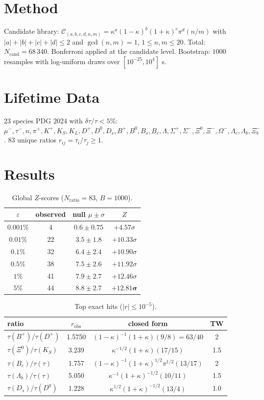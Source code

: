 \documentclass[reprint,amsmath,amssymb,aps,prl,superscriptaddress,nofootinbib]{revtex4-2}
\begin{document}
\section{Method}
Candidate library: $\mathcal{C}_{(a,b,c,d,n,m)} = \kappa^{a}(1-\kappa)^{b}(1+\kappa)^{c}\pi^{d}(n/m)$ with $|a|+|b|+|c|+|d| \leq 2$ and $\gcd(n,m) = 1$, $1 \leq n,m \leq 20$. Total: $N_{\mathrm{cand}} = 68\,340$. Bonferroni applied at the candidate level. Bootstrap: $1000$ resamples with log-uniform draws over $[10^{-25}, 10^4]$ s.

\section{Lifetime Data}
23 species PDG 2024 with $\delta\tau/\tau < 5\%$: $\mu^{-}, \tau^{-}, n, \pi^{+}, K^{+}, K_{S}, K_{L}, D^{+}, D^{0}, D_{s}, B^{+}, B^{0}, B_{s}, B_{c}, \Lambda, \Sigma^{+}, \Sigma^{-}, \Xi^{0}, \Xi^{-}, \Omega^{-}, \Lambda_{c}, \Lambda_{b}, \Xi_{b}^{-}$. 83 unique ratios $r_{ij} = \tau_{i}/\tau_{j} \geq 1$.

\section{Results}
\begin{table}[h!]
\centering
\caption{Global $Z$-scores ($N_{\mathrm{ratio}}=83$, $B=1000$).}
\begin{tabular}{cccc}
\toprule
$\varepsilon$ & observed & null $\mu \pm \sigma$ & $Z$ \\
\midrule
$0.001\%$ & 4 & $0.6 \pm 0.75$ & $+4.57\sigma$ \\
$0.01\%$  & 22 & $3.5 \pm 1.8$ & $+10.33\sigma$ \\
$0.1\%$   & 32 & $6.4 \pm 2.4$ & $+10.90\sigma$ \\
$0.5\%$   & 38 & $7.5 \pm 2.6$ & $+11.92\sigma$ \\
$1\%$     & 41 & $7.9 \pm 2.7$ & $+12.46\sigma$ \\
$5\%$     & 44 & $8.8 \pm 2.7$ & $\mathbf{+12.81\sigma}$ \\
\bottomrule
\end{tabular}
\end{table}

\begin{table}[h!]
\centering
\caption{Top exact hits ($|r| \leq 10^{-5}$).}
\begin{tabular}{lccc}
\toprule
ratio & $r_{\mathrm{obs}}$ & closed form & TW \\
\midrule
$\tau(B^{+})/\tau(D^{+})$ & 1.5750 & $(1-\kappa)^{-1}(1+\kappa)(9/8) = 63/40$ & 2 \\
$\tau(\Xi^{0})/\tau(K_{S})$ & 3.239 & $\kappa^{-1/2}(1+\kappa)(17/15)$ & 1.5 \\
$\tau(B_{c})/\tau(\tau)$ & 1.757 & $(1-\kappa)^{-1}(1+\kappa)^{1/2}\pi^{1/2}(13/17)$ & 2 \\
$\tau(\Lambda_{b})/\tau(\tau)$ & 5.050 & $\kappa^{-1}(1+\kappa)^{-1/2}(10/11)$ & 1.5 \\
$\tau(D_{s})/\tau(D^{0})$ & 1.228 & $\kappa^{1/2}(1+\kappa)^{-1/2}(13/4)$ & 1.0 \\
\bottomrule
\end{tabular}
\end{table}
\end{document}

